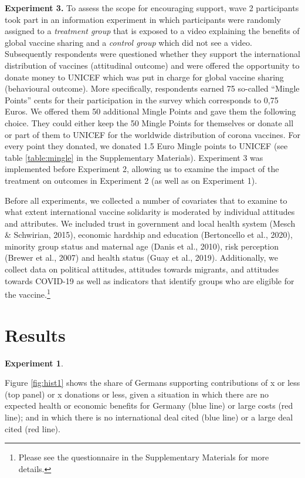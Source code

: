 \documentclass[12pt,oneside,smallheadings,chapterprefix=true]{article}
\begin{document}
\textbf{Experiment 3.} To assess the scope for encouraging support, wave 2 participants took part in an information experiment in which participants were randomly assigned to a \emph{treatment group} that is exposed to a video explaining the benefits of global vaccine sharing and a \emph{control group} which did not see a video. Subsequently respondents were questioned whether they support the international distribution of vaccines (attitudinal outcome) and were offered the opportunity to donate money to UNICEF which was put in charge for global vaccine sharing (behavioural outcome). More specifically, respondents earned 75 so-called "`Mingle Points"' cents for their participation in the survey which corresponds to 0,75 Euros. We offered them  50 additional Mingle Points and gave them the following choice. They could either keep the 50 Mingle Points for themselves  or donate all or part of them to UNICEF for the worldwide distribution of corona vaccines. For every point they donated, we donated 1.5 Euro Mingle points to UNICEF (see table \ref{table:mingle} in the Supplementary Materials). Experiment 3 was implemented before Experiment 2, allowing us to examine the impact of the treatment on outcomes in Experiment 2 (as well as on Experiment 1).


Before all experiments, we collected a number of covariates that to examine to what extent international vaccine solidarity is moderated by individual attitudes and attributes. We included trust in government and local health system (Mesch
\& Schwirian, 2015), economic hardship and education (Bertoncello et al.,
2020), minority group status and maternal age (Danis et al., 2010), risk
perception (Brewer et al., 2007) and health status (Guay et al., 2019).
Additionally, we collect data on political attitudes, attitudes towards
migrants, and attitudes towards COVID-19 as well as indicators that
identify groups who are eligible for the vaccine.\footnote{Please see the
questionnaire in the Supplementary Materials for more details.}



\section*{Results}
\label{sec:results}

\textbf{Experiment 1}. 

Figure \ref{fig:hist1} shows the share of Germans supporting contributions of \texteuro x or less (top panel) or x donations or less, given a situation in which there are no expected health or economic benefits for Germany (blue line) or large costs (red line); and in which there is no international deal cited (blue line) or a large deal cited (red line).
\end{document}
